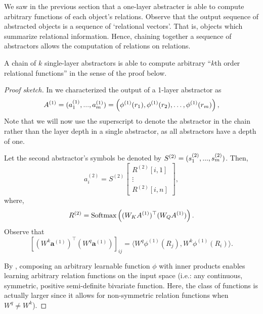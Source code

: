 We saw in the previous section that a one-layer abstracter is able to compute arbitrary functions  of each object's relations. Observe that the output sequence of abstracted objects is a sequence of `relational vectors'. That is, objects which summarize relational information. Hence, chaining together a sequence of  abstractors allows the computation of relations on relations.

\begin{lemma}
	\label{lemma:function_class_composed_abstractors}
	A chain of $k$ single-layer  abstractors is able to compute arbitrary ``$k$th order relational functions'' in the sense of the proof below.
\end{lemma}
\begin{proof}[Proof sketch]
	In  we characterized the output of a 1-layer abstractor as
	\begin{equation*}
		A^{(1)} = (a_1^{(1)}, ..., a_\m^{(1)}) = \left(\phi^{(1)}(r_1), \phi^{(1)}(r_2), \ldots, \phi^{(1)}(r_\m)\right),
	\end{equation*}
	Note that we will now use the superscript to denote the abstractor in the chain rather than the layer depth in a single  abstractor, as all  abstractors have a depth of one.

	Let the second abstractor's symbols be denoted by $S^{(2)} = (s_1^{(2)}, ..., s_m^{(2)})$. Then,
	\begin{equation*}
		a_i^{(2)} = S^{(2)} \begin{bmatrix}R^{(2)}[i,1] \\ \vdots \\ R^{(2)}[i,n]\end{bmatrix},
	\end{equation*}
	where,
	\begin{equation*}
		R^{(2)} = \Softmax\left((W_K A^{(1)})^\top (W_Q A^{(1)})\right).
	\end{equation*}
	Observe that
	\begin{equation*}
		\left[(W^k \boldsymbol{a}^{(1)})^\top (W^q \boldsymbol{a}^{(1)})\right]_{ij} = \langle W^q \phi^{(1)}(R_j), W^k \phi^{(1)}(R_i) \rangle.
	\end{equation*}

	By , composing an arbitrary learnable function $\phi$ with inner products enables learning arbitrary relation functions on the input space (i.e.: any continuous, symmetric, positive semi-definite bivariate function. Here, the class of functions is actually larger since it allows for non-symmetric relation functions when $W^q \neq W^k$).


\end{proof}
